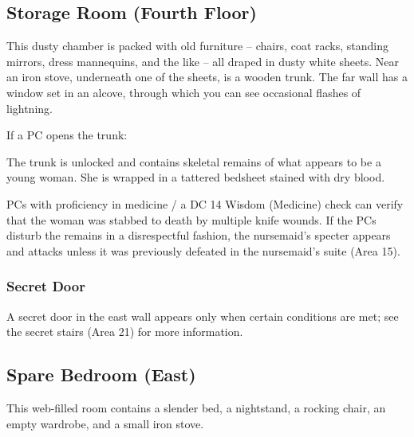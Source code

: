 \subsection{Storage Room (Fourth Floor)}
\label{sec:StorageRoom4tFlr}
\begin{readout}
  This dusty chamber is packed with old furniture -- chairs, coat racks, standing mirrors, dress mannequins,
  and the like -- all draped in dusty white sheets. Near an iron stove, underneath one of the sheets, is
  a wooden trunk. The far wall has a window set in an alcove, through which you can see occasional flashes
  of lightning.
\end{readout}
If a PC opens the trunk:
\begin{readout}
  The trunk is unlocked and contains skeletal remains of what appears to be a young woman. She is wrapped in
  a tattered bedsheet stained with dry blood.
\end{readout}
PCs with proficiency in medicine / a DC 14 Wisdom (Medicine) check can verify that the woman was stabbed
to death by multiple knife wounds. If the PCs disturb the remains in a disrespectful fashion, the nursemaid's
specter appears and attacks unless it was previously defeated in the nursemaid's suite (Area 15).

\subsubsection*{Secret Door}
A secret door in the east wall appears only when certain conditions are met; see the secret stairs (Area 21)
for more information.

\begin{arealinks}
\end{arealinks}


\pagebreak
\subsection{Spare Bedroom (East)}
\label{sec:SpareBedroomEast}
\begin{readout}
  This web-filled room contains a slender bed, a nightstand, a rocking chair, an empty wardrobe, and a small
  iron stove.
\end{readout}

\begin{arealinks}
\end{arealinks}


\pagebreak
